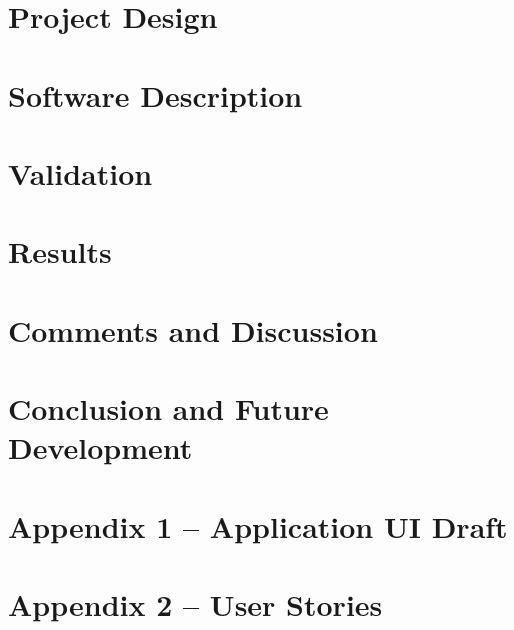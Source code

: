 \documentclass[12pt, a4paper]{report}
\begin{document}
\chapter{Project Design}\label{chapter:project-design}


\chapter{Software Description}\label{chapter:software-description}


\chapter{Validation}\label{chapter:validation}


\chapter{Results}\label{chapter:results}


\chapter{Comments and Discussion}\label{chapter:comments}


\chapter{Conclusion and Future Development}\label{chapter:conclusion-future-development}


\pagebreak
{}
{}
\printbibliography

\pagebreak
{}
\appendix
\renewcommand{\thechapter}{\arabic{chapter}}

\clearpage
{}
{}
\chapter*{Appendix 1 – Application UI Draft}


\clearpage
{}
{}
\chapter*{Appendix 2 – User Stories}\label{appendix:user-requirements}

\end{document}
